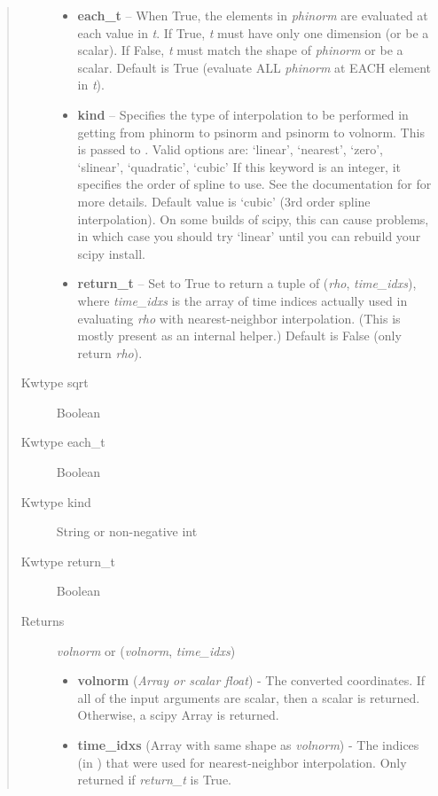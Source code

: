 \documentclass[letterpaper,10pt,english]{sphinxmanual}
\begin{document}
\begin{fulllineitems}
\begin{fulllineitems}
\begin{quote}
\begin{description}
\begin{itemize}
\item {} 
\textbf{each\_t} -- When True, the elements in \emph{phinorm} are evaluated
at each value in \emph{t}. If True, \emph{t} must have only one dimension
(or be a scalar). If False, \emph{t} must match the shape of \emph{phinorm}
or be a scalar. Default is True (evaluate ALL \emph{phinorm} at EACH
element in \emph{t}).

\item {} 
\textbf{kind} -- Specifies the type of
interpolation to be performed in getting from phinorm to
psinorm and psinorm to volnorm. This is passed to
. Valid options are:
`linear', `nearest', `zero', `slinear', `quadratic', `cubic'
If this keyword is an integer, it specifies the order of spline
to use. See the documentation for  for more
details. Default value is `cubic' (3rd order spline
interpolation). On some builds of scipy, this can cause problems,
in which case you should try `linear' until you can rebuild your
scipy install.

\item {} 
\textbf{return\_t} -- Set to True to return a tuple of (\emph{rho},
\emph{time\_idxs}), where \emph{time\_idxs} is the array of time indices
actually used in evaluating \emph{rho} with nearest-neighbor
interpolation. (This is mostly present as an internal helper.)
Default is False (only return \emph{rho}).

\end{itemize}

\item[{Kwtype sqrt}] \leavevmode
Boolean

\item[{Kwtype each\_t}] \leavevmode
Boolean

\item[{Kwtype kind}] \leavevmode
String or non-negative int

\item[{Kwtype return\_t}] \leavevmode
Boolean

\item[{Returns}] \leavevmode

\emph{volnorm} or (\emph{volnorm}, \emph{time\_idxs})
\begin{itemize}
\item {} 
\textbf{volnorm} (\emph{Array or scalar float}) - The converted coordinates. If
all of the input arguments are scalar, then a scalar is returned.
Otherwise, a scipy Array is returned.

\item {} 
\textbf{time\_idxs} (Array with same shape as \emph{volnorm}) - The indices
(in ) that were used for
nearest-neighbor interpolation. Only returned if \emph{return\_t} is
True.


\end{itemize}
\end{description}
\end{quote}
\end{fulllineitems}
\end{fulllineitems}
\end{document}
